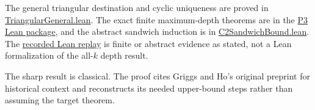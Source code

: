 \documentclass[11pt,a4paper]{article}
\begin{document}
The general triangular destination and cyclic uniqueness are proved in \href{https://github.com/mpelteshki/climbing-to-the-frontier/blob/212bba53b1818c08c40b8c4b48f636651eaf6410/cagent/p3/lean/ProofPursuit/P3/TriangularGeneral.lean}{TriangularGeneral.lean}. The exact finite maximum-depth theorems are in the \href{https://github.com/mpelteshki/climbing-to-the-frontier/tree/212bba53b1818c08c40b8c4b48f636651eaf6410/cagent/p3/lean/ProofPursuit/P3}{P3 Lean package}, and the abstract sandwich induction is in \href{https://github.com/mpelteshki/climbing-to-the-frontier/blob/212bba53b1818c08c40b8c4b48f636651eaf6410/cagent/p3/lean/ProofPursuit/P3/C2SandwichBound.lean}{C2SandwichBound.lean}. The \href{https://github.com/mpelteshki/climbing-to-the-frontier/blob/212bba53b1818c08c40b8c4b48f636651eaf6410/cagent/p3/evidence/verification.json}{recorded Lean replay} is finite or abstract evidence as stated, not a Lean formalization of the all-\(k\) depth result.

The sharp result is classical. The proof cites Griggs and Ho's original preprint for historical context and reconstructs its needed upper-bound steps rather than assuming the target theorem.
\end{document}
